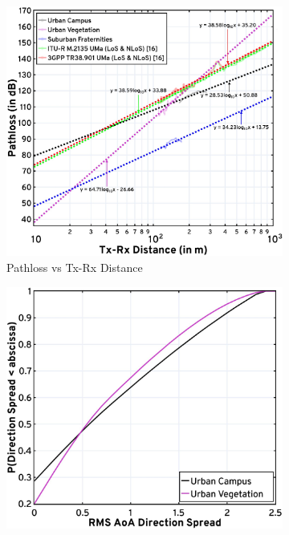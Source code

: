 \documentclass[12pt, draftcls, onecolumn]{IEEEtran}
\begin{document}
\begin{figure} [t]
     \centering
     \begin{subfigure}{0.485\linewidth}
         \centering
         \includegraphics[width=1.0\linewidth]{figs/pl_distance_updated.jpg}
         \caption{Pathloss vs Tx-Rx Distance}
         \label{F7a}
     \end{subfigure}
     \begin{subfigure}{0.505\linewidth}
         \centering
         \includegraphics[width=1.0\linewidth]{figs/rms_direction_spread_updated.jpg}

\end{subfigure}
\end{figure}
\end{document}
